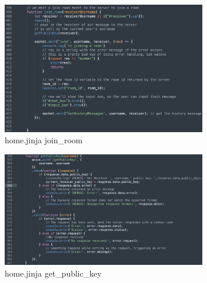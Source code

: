 \documentclass[12pt]{article}
\begin{document}
\begin{enumerate}
            \begin{figure}[H]
                \centering{}
                \includegraphics[width=0.8\textwidth]{graphs/front_join_room.jpg}
                \caption{home.jinja join\_room}
                \label{front join room}
            \end{figure}

            \begin{figure}[H]
                \centering
                \includegraphics[width=0.8\textwidth]{graphs/front_get_public_key}
                \caption{home.jinja get\_public\_key}
                \label{get public key}
            \end{figure}



\end{enumerate}
\end{document}
